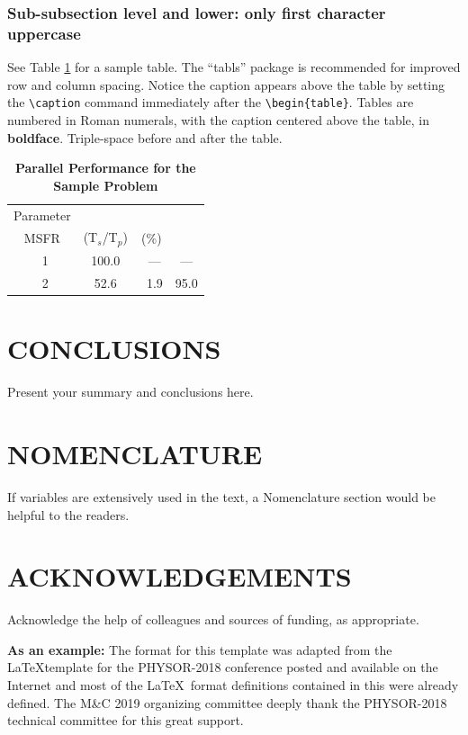 \documentclass[letterpaper]{mandc2019}
\begin{document}
\subsubsection{Sub-subsection level and lower: only first character uppercase}

See Table \ref{table:example} for a sample table.  The ``tabls'' package is
recommended for improved row and column spacing.  Notice the caption appears 
above the table by setting the \verb!\caption! command immediately 
after the \verb!\begin{table}!. Tables are numbered in Roman 
numerals, with the caption centered above the table, in \textbf{boldface}.  
Triple-space before and after the table.

\begin{table}[!htb]
  \centering
  \caption{\bf Parallel Performance for the Sample Problem}
  \label{table:example} 
  \begin{tabular}{|c|c|c|c|} \hline 
   Parameter \\ \gls{MSFR} & (T$_{s}$/T$_{p}$) & (\%) \\ \hline
    \ 1 &  100.0 & \ ---    & ---  \\ \hline
    \ 2 &   52.6 & \ 1.9    & 95.0 \\ \hline 
  \end{tabular}
\end{table}

\section{CONCLUSIONS}

Present your summary and conclusions here.

\section*{NOMENCLATURE}

If variables are extensively used in the text, a Nomenclature section would be helpful to the readers.

\section*{ACKNOWLEDGEMENTS}

Acknowledge the help of colleagues and sources of funding, as appropriate.

\textbf{As an example:} The format for this template was adapted from the \LaTeX template for the PHYSOR-2018 conference posted and available on the Internet and 
most of the \LaTeX\ format definitions contained in this were already defined. The 
M\&C 2019 organizing committee deeply thank the PHYSOR-2018 technical committee 
for this great support.

\setlength{\baselineskip}{12pt}


\end{document}
